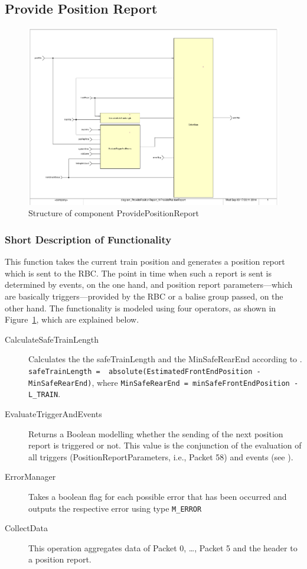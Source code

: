 \subsection{Provide Position Report}\label{sss:provposrep}

\begin{figure}
\centering
\includegraphics[width=\textwidth]{../images/ProvidePositionReport.pdf}
\caption{Structure of component ProvidePositionReport}\label{fig:provideposrep}
\end{figure}

\subsubsection{Short Description of Functionality}
This function takes the current train position and generates a position report which is sent to the RBC. The point in time when such a report is sent is determined by events, on the one hand, and position report parameters---which are basically triggers---provided by the RBC or a balise group passed, on the other hand. The functionality is modeled using four operators, as shown in Figure~\ref{fig:provideposrep}, which are explained below.
\begin{description}
	\item[CalculateSafeTrainLength] Calculates the the safeTrainLength and the MinSafeRearEnd according to \cite[Chapter~3.6.5.2.4/5]{subset-026}. \\
\verb+safeTrainLength =  absolute(EstimatedFrontEndPosition - MinSafeRearEnd)+, where
\verb+MinSafeRearEnd = minSafeFrontEndPosition - L_TRAIN+.
	\item[EvaluateTriggerAndEvents] Returns a Boolean modelling whether the sending of the next position report is triggered or not. This value is the conjunction of the evaluation of all triggers (PositionReportParameters, i.e., Packet 58) and events (see \cite[Chapter~3.6.5.1.4]{subset-026}).
	\item[ErrorManager] Takes a boolean flag for each possible error that has been occurred and outputs the respective error using type \verb+M_ERROR+
	\item[CollectData] This operation aggregates data of Packet 0, \dots, Packet 5 and the header to a position report.
\end{description}

